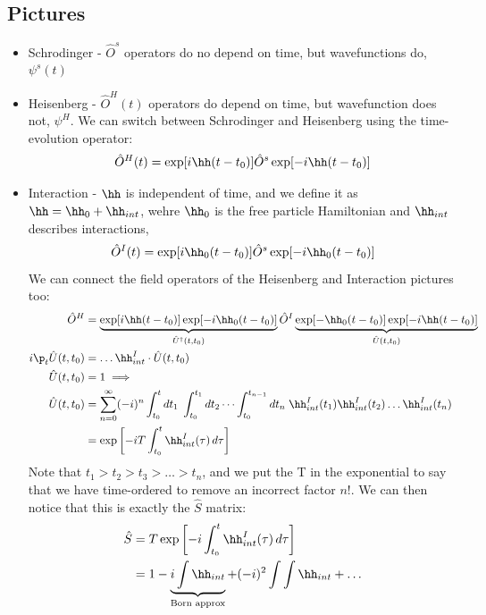 \documentclass[a4paper, 11pt, normalem]{report}
\begin{document}
\chapter{}
\section{Pictures}
\begin{itemize}
    \item Schrodinger - $\hat{O}^{s}$ operators do no depend on time, but wavefunctions do, $\psi^s(t)$
    \item Heisenberg - $\hat{O}^H(t)$ operators do depend on time, but wavefunction does not, $\psi^H$.
        We can switch between Schrodinger and Heisenberg using the time-evolution operator: 
        \begin{align}
            \hat{O}^H(t) &= \exp[i\hh(t-t_0)]\hat{O}^s\exp[-i\hh(t-t_0)] \\
        \end{align}
    \item Interaction - $\hh$ is independent of time, and we define it as $\hh = \hh_0 + \hh_{int}$, wehre $\hh_0$ is the free particle Hamiltonian and $\hh_{int}$ describes interactions,
        \begin{equation}
            \hat{O}^I(t) = \exp[i\hh_0(t-t_0)]\hat{O}^s\exp[-i\hh_0(t-t_0)]
        \end{equation}
        We can connect the field operators of the Heisenberg and Interaction pictures too:
        \begin{align}
            \hat{O}^H &= \underbrace{\exp[i\hh(t-t_0)]\exp[-i\hh_0(t-t_0)]}_{\hat{U}^\dagger(t,t_0)}\hat{O}^I\underbrace{\exp[-\hh_0(t-t_0)]\exp[-i\hh(t-t_0)]}_{\hat{U}(t,t_0)} \\
            i\p_t\hat{U}(t,t_0) &= \dots \hh_{int}^I\cdot\hat{U}(t,t_0) \\
            \hat{U}(t,t_0) &= 1 \implies \\
            \hat{U}(t,t_0) &= \sum_{n=0}^\infty (-i)^n \int_{t_0}^t dt_1\; \int_{t_0}^{t_1} dt_2\, \dots \int_{t_0}^{t_{n-1}}dt_n \; \hh_{int}^I(t_1)\hh_{int}^I(t_2)\dots\hh_{int}^I(t_n) \\
                           &= \exp\left[-iT \int_{t_0}^t \hh_{int}^I(\tau)\,d\tau\right]
        \end{align}
        Note that $t_1>t_2>t_3>\dots>t_n$, and we put the T in the exponential to say that we have time-ordered to remove an incorrect factor $n!$.
        We can then notice that this is exactly the $\hat{S}$ matrix: 
        \begin{align}
            \hat{S} &= T\exp\left[-i\int_{t_0}^t \hh_{int}^I(\tau)\,d\tau\right] \\
                    &= 1 - \underbrace{i\int \hh_{int}}_{\text{Born approx}} + (-i)^2 \int \int \hh_{int} + \dots
        \end{align}
\end{itemize}
\end{document}

